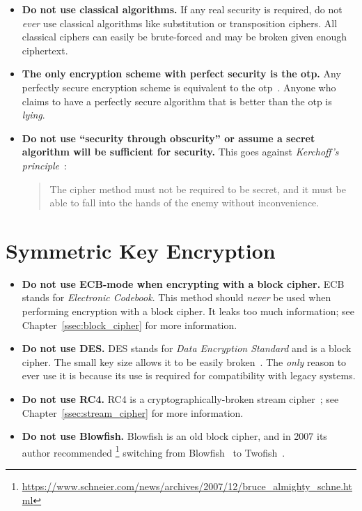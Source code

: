 \begin{itemize}
\item \textbf{Do not use classical algorithms.}
    If any real security is required, do not \emph{ever} use
    classical algorithms like substitution or transposition ciphers.
    All classical ciphers can easily be brute-forced and may
    be broken given enough ciphertext.

\item \textbf{The only \gls{encryption scheme} with \gls{perfect security}
    is the \gls{otp}.}
    Any perfectly secure encryption scheme is equivalent to the
    \gls{otp}~\cite[Theorems 2.10 and 2.11]{IntroModernCrypto}.
    Anyone who claims to have a perfectly secure algorithm
    that is better than the \gls{otp} is \emph{lying}.

\item \textbf{Do not use ``security through obscurity'' or
    assume a secret algorithm will be sufficient for security.}
    This goes against
    \emph{Kerchoff's principle}~\cite[Page 5]{IntroModernCrypto}:

\begin{quote}
    The cipher method must not be required to be secret,
    and it must be able to fall into the hands of the enemy
    without inconvenience.
\end{quote}

\end{itemize}

\section{Symmetric Key Encryption}

\begin{itemize}
\item \textbf{Do not use ECB-mode when encrypting with a \gls{block cipher}.}
    ECB stands for \emph{Electronic Codebook}.
    This method should \emph{never} be used when performing
    encryption with a \gls{block cipher}.
    It leaks too much information; see Chapter~\ref{ssec:block_cipher}
    for more information.
\item \textbf{Do not use DES.}
    DES stands for \emph{Data Encryption Standard} and is a \gls{block cipher}.
    The small key size allows it to be easily broken~\cite{rfc4772}.
    The \emph{only} reason to ever use it is because its use is required
    for compatibility with legacy systems.
\item \textbf{Do not use RC4.}
    RC4 is a cryptographically-broken \gls{stream cipher}~\cite{rfc7465};
    see Chapter~\ref{ssec:stream_cipher} for more information.
\item \textbf{Do not use Blowfish.}
    Blowfish is an old \gls{block cipher},
    and in 2007 its author recommended%
    \footnote{\url{https://www.schneier.com/news/archives/2007/12/bruce_almighty_schne.html}}
    switching from Blowfish~\cite{BlowfishAlg} to Twofish~\cite{TwofishAlg}.
\end{itemize}

